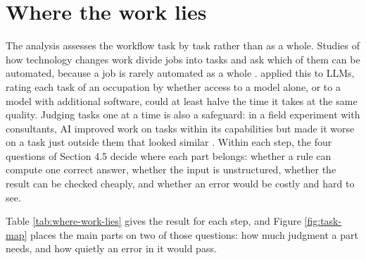 \section{Where the work lies}

The analysis assesses the workflow task by task rather than as a whole.
Studies of how technology changes work divide jobs into tasks and ask which of them can be automated, because a job is rarely automated as a whole \citep{autor2003skill}.
\citet{eloundou2024gpts} applied this to LLMs, rating each task of an occupation by whether access to a model alone, or to a model with additional software, could at least halve the time it takes at the same quality.
Judging tasks one at a time is also a safeguard: in a field experiment with consultants, AI improved work on tasks within its capabilities but made it worse on a task just outside them that looked similar \citep{dellacqua2026navigating}.
Within each step, the four questions of Section 4.5 decide where each part belongs: whether a rule can compute one correct answer, whether the input is unstructured, whether the result can be checked cheaply, and whether an error would be costly and hard to see.

Table \ref{tab:where-work-lies} gives the result for each step, and Figure \ref{fig:task-map} places the main parts on two of those questions: how much judgment a part needs, and how quietly an error in it would pass.

